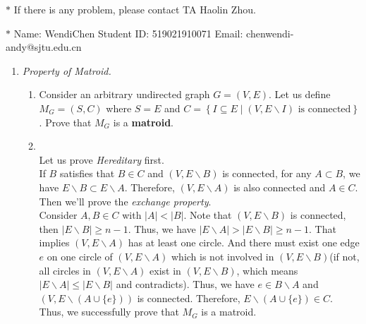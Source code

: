 \documentclass[12pt,a4paper]{article}
\makeatletter
\newtheorem*{solution}{Solution}
\theoremstyle{definition}
\renewenvironment{solution}[1][Solution] {\par\pushQED{\qed}\normalfont\topsep6\p@\@plus6\p@\relax\trivlist\item[\hskip\labelsep\bfseries#1\@addpunct{.}]\ignorespaces}{\popQED\endtrivlist\@endpefalse} \makeatother
\makeatother
\begin{document}
\noindent

\noindent{}
\begin{center}
\footnotesize{\color{red}$*$ If there is any problem, please contact TA Haolin Zhou.}

\footnotesize{\color{blue}$*$ Name: WendiChen  \quad Student ID: 519021910071 \quad Email: chenwendi-andy@sjtu.edu.cn}
\end{center}

\begin{enumerate}
\item \textit{Property of Matroid.} 
\begin{enumerate}
	\item
	Consider an arbitrary undirected graph $ G=(V,E) $. Let us define $ M_{G}=(S,C) $ where $ S=E $ and $ C=\left\{I \subseteq E \mid\left(V, E \backslash I\right) \text { is connected}\right\} $. Prove that $ M_{G} $ is a \textbf{matroid}.\par
	\begin{solution}
	 ~\\
	 Let us prove \emph{Hereditary} first.\\
	 If $B$ satisfies that $B\in C$ and $(V,E\backslash B)$ is connected, for any $A\subset B$, we have $E\backslash B \subset E\backslash A$.
	 Therefore, $(V,E\backslash A)$ is also connected and $A \in C$.\\
	 Then we'll prove the \emph{exchange property}. \\
	 Consider $A,B \in C$ with $|A|<|B|$. Note that $(V,E\backslash B)$ is connected, then $|E\backslash B|\ge n-1$. Thus, we have $|E\backslash A|>|E\backslash B|\ge n-1$.
	 That implies $(V,E\backslash A)$ has at least one circle.
	 And there must exist one edge $e$ on one circle of $(V,E\backslash A)$ which is not involved in $(V,E\backslash B)$(if not, all circles in $(V,E\backslash A)$ exist in $(V,E\backslash B)$, which means $|E\backslash A|\leq|E\backslash B|$ and contradicts).
	 Thus, we have $e\in B\backslash A$ and $(V,E\backslash (A\cup \{e\}))$ is connected. Therefore, $E\backslash (A\cup \{e\}) \in C$.\\
	 Thus, we successfully prove that $M_G$ is a matroid.
	 \begin{figure}[htbp]

\end{figure}
\end{solution}
\end{enumerate}
\end{enumerate}
\end{document}
